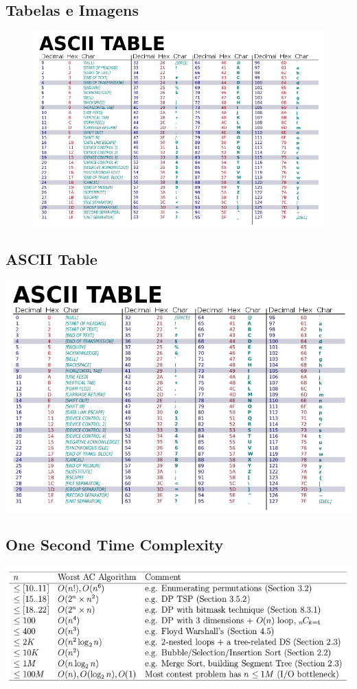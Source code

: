 \documentclass{article}
\begin{document}
\begin{multicols}{2}

\tableofcontents


\newpage

\section{Tabelas e Imagens}

\begin{figure}[t]
   \centering
   \includegraphics[scale=0.5]{ascii_table.png}
\end{figure}

\subsection{ASCII Table}
\includegraphics[scale=0.4]{ascii_table.png}
\subsection{One Second Time Complexity}
\includegraphics[scale=0.4]{one_second_time_complexity.png}


\end{multicols}
\end{document}
